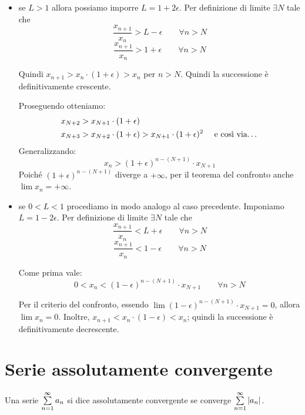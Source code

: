 \begin{itemize}
\item se $L > 1$ allora possiamo imporre $L = 1 + 2\epsilon$. Per definizione di limite $\exists N$ tale che 
\begin{equation*}
\frac{x_{n+1}}{x_n} > L - \epsilon \qquad \forall n > N
\end{equation*}
\begin{equation*}
\frac{x_{n+1}}{x_n} > 1 + \epsilon \qquad \forall n > N
\end{equation*}

Quindi $x_{n+1} > x_n \cdot (1+\epsilon) > x_n$ per $n > N$. Quindi la successione è definitivamente crescente.

Proseguendo otteniamo:
\begin{align*}
x_{N+2} &> x_{N+1} \cdot (1+\epsilon) \\
x_{N+3} &> x_{N+2} \cdot (1+\epsilon) > x_{N+1} \cdot (1+\epsilon)^2 \quad \text { e così via\dots}
\end{align*}
Generalizzando:
\begin{equation*}
x_n > (1+\epsilon)^{n-(N+1)} \cdot x_{N+1}
\end{equation*}
Poiché $(1+\epsilon)^{n-(N+1)}$ diverge a $+\infty$, per il teorema del confronto anche $\lim x_n = +\infty$.

\item se $0 < L < 1$ procediamo in modo analogo al caso precedente. Imponiamo $L = 1 - 2\epsilon$. Per definizione di limite $\exists N$ tale che
\begin{equation*}
\frac{x_{n+1}}{x_n} < L + \epsilon \qquad \forall n > N
\end{equation*}
\begin{equation*}
\frac{x_{n+1}}{x_n} < 1 - \epsilon \qquad \forall n > N
\end{equation*}

Come prima vale:
\begin{equation*}
0 < x_n < (1-\epsilon)^{n-(N+1)} \cdot x_{N+1} \qquad \forall n>N
\end{equation*}

Per il criterio del confronto, essendo $\lim (1-\epsilon)^{n-(N+1)} \cdot x_{N+1} = 0$, allora $\lim x_n = 0$. Inoltre, $x_{n+1} < x_n \cdot (1 - \epsilon) < x_n$; quindi la successione è definitivamente decrescente.
\end{itemize}

\section{Serie assolutamente convergente}
Una serie $\sum\limits_{n=1}^{\infty}a_n$ si dice assolutamente convergente se converge $\sum\limits_{n=1}^{\infty}|a_n|$.

